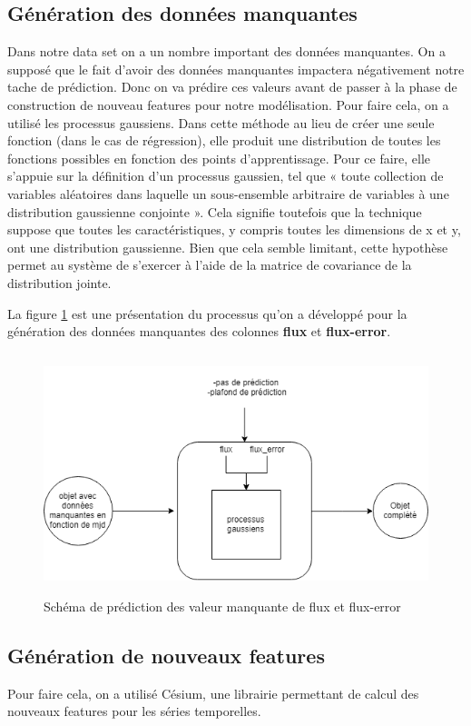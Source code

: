 \subsection{Génération des données manquantes}
Dans notre data set on a un nombre important des données manquantes. On a supposé que le fait d’avoir des données manquantes impactera négativement notre tache de prédiction. Donc on va prédire ces valeurs avant de passer à la phase de construction de nouveau features pour notre modélisation. Pour faire cela, on a utilisé les processus gaussiens. Dans cette méthode au lieu de créer une seule fonction  (dans le cas de régression), elle produit une distribution de toutes les fonctions possibles en fonction des points d'apprentissage. Pour ce faire, elle s’appuie sur la définition d’un processus gaussien, tel que « toute collection de variables aléatoires dans laquelle un sous-ensemble arbitraire de variables à une distribution gaussienne conjointe ». Cela signifie toutefois que la technique suppose que toutes les caractéristiques, y compris toutes les dimensions de x et y, ont une distribution gaussienne. Bien que cela semble limitant, cette hypothèse permet au système de s'exercer à l'aide de la matrice de covariance de la distribution jointe.

La figure \ref{fig:blackbox_shema} est une présentation du processus qu'on a développé pour la génération des données manquantes des colonnes \textbf{flux} et \textbf{flux-error}.
\begin{figure}[!h]
    \centering
    \includegraphics[width=12cm,height=7cm]{report/figures/blackbox.png}
    \caption{Schéma de prédiction des valeur manquante de flux et flux-error}
    \label{fig:blackbox_shema}
\end{figure}
\subsection{Génération de nouveaux features}
Pour faire cela, on a utilisé Césium, une librairie permettant de calcul des nouveaux features pour les séries temporelles. 
